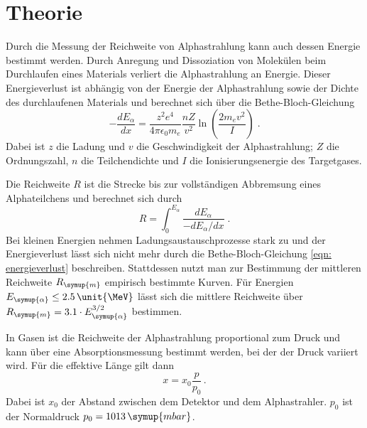 \section{Theorie}
\label{sec:Theorie}

Durch die Messung der Reichweite von Alphastrahlung kann auch dessen
Energie bestimmt werden. Durch Anregung und Dissoziation von Molekülen beim 
Durchlaufen eines Materials verliert die Alphastrahlung an Energie. Dieser
Energieverlust ist abhängig von der Energie der Alphastrahlung sowie der
Dichte des durchlaufenen Materials und berechnet sich über die Bethe-Bloch-Gleichung
\begin{equation}
    -\frac{d E_\alpha}{d x}=\frac{z^2 e^4}{4 \pi \epsilon_0 m_e} \frac{n Z}{v^2} \ln \left(\frac{2 m_e v^2}{I}\right) \; .
    \label{eqn: energieverlust}
\end{equation}
Dabei ist $z$ die Ladung und $v$ die Geschwindigkeit der Alphastrahlung; $Z$ die Ordnungszahl,
$n$ die Teilchendichte und $I$ die Ionisierungsenergie des Targetgases. 

Die Reichweite $R$ ist die Strecke bis zur vollständigen Abbremsung eines 
Alphateilchens und berechnet sich durch 
\begin{equation*}
    R=\int_0^{E_\alpha} \frac{d E_\alpha}{-d E_\alpha / d x} \; .
\end{equation*}
Bei kleinen Energien nehmen Ladungsaustauschprozesse stark zu und der
Energieverlust lässt sich nicht mehr durch die Bethe-Bloch-Gleichung 
\eqref{eqn: energieverlust} beschreiben. Stattdessen nutzt man zur Bestimmung
der mittleren Reichweite $R_{\symup{m}}$ empirisch bestimmte Kurven. Für 
Energien $E_{\symup{\alpha}} \leq 2.5 \, \unit{\MeV}$ lässt sich die mittlere 
Reichweite über $R_{\symup{m}} = 3.1 \cdot E_{\symup{\alpha}}^{3/2}$ bestimmen.

In Gasen ist die Reichweite der Alphastrahlung proportional zum Druck und kann
über eine Absorptionsmessung bestimmt werden, bei der der Druck variiert wird.
Für die effektive Länge gilt dann 
\begin{equation}
    x = x_0 \frac{p}{p_0} \, .
    \label{eqn:effLaeng}
\end{equation}
Dabei ist $x_0$ der Abstand zwischen dem Detektor und dem Alphastrahler. 
$p_0$ ist der Normaldruck $p_0 = 1013 \, \symup{mbar}$.